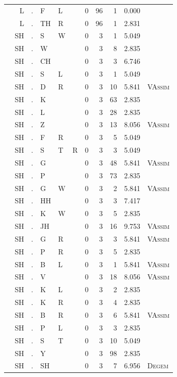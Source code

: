 \documentclass[12pt]{article}
\begin{document}
\begin{longtable}{r@{ } r@{ } c@{ } l@{ } l@{ } l@{ } r r r r l }
 & L & . & F & L &  & 0 & 96 & 1 & 0.000 &  \\
 & L & . & TH & R &  & 0 & 96 & 1 & 2.831 &  \\
 & SH & . & S & W &  & 0 & 3 & 1 & 5.049 &  \\
 & SH & . & W &  &  & 0 & 3 & 8 & 2.835 &  \\
 & SH & . & CH &  &  & 0 & 3 & 3 & 6.746 &  \\
 & SH & . & S & L &  & 0 & 3 & 1 & 5.049 &  \\
 & SH & . & D & R &  & 0 & 3 & 10 & 5.841 & \textsc{VAssim} \\
 & SH & . & K &  &  & 0 & 3 & 63 & 2.835 &  \\
 & SH & . & L &  &  & 0 & 3 & 28 & 2.835 &  \\
 & SH & . & Z &  &  & 0 & 3 & 13 & 8.056 & \textsc{VAssim} \\
 & SH & . & F & R &  & 0 & 3 & 5 & 5.049 &  \\
 & SH & . & S & T & R & 0 & 3 & 3 & 5.049 &  \\
 & SH & . & G &  &  & 0 & 3 & 48 & 5.841 & \textsc{VAssim} \\
 & SH & . & P &  &  & 0 & 3 & 73 & 2.835 &  \\
 & SH & . & G & W &  & 0 & 3 & 2 & 5.841 & \textsc{VAssim} \\
 & SH & . & HH &  &  & 0 & 3 & 3 & 7.417 &  \\
 & SH & . & K & W &  & 0 & 3 & 5 & 2.835 &  \\
 & SH & . & JH &  &  & 0 & 3 & 16 & 9.753 & \textsc{VAssim} \\
 & SH & . & G & R &  & 0 & 3 & 3 & 5.841 & \textsc{VAssim} \\
 & SH & . & P & R &  & 0 & 3 & 5 & 2.835 &  \\
 & SH & . & B & L &  & 0 & 3 & 1 & 5.841 & \textsc{VAssim} \\
 & SH & . & V &  &  & 0 & 3 & 18 & 8.056 & \textsc{VAssim} \\
 & SH & . & K & L &  & 0 & 3 & 2 & 2.835 &  \\
 & SH & . & K & R &  & 0 & 3 & 4 & 2.835 &  \\
 & SH & . & B & R &  & 0 & 3 & 6 & 5.841 & \textsc{VAssim} \\
 & SH & . & P & L &  & 0 & 3 & 3 & 2.835 &  \\
 & SH & . & S & T &  & 0 & 3 & 10 & 5.049 &  \\
 & SH & . & Y &  &  & 0 & 3 & 98 & 2.835 &  \\
 & SH & . & SH &  &  & 0 & 3 & 7 & 6.956 & \textsc{Degem} \\

\end{longtable}
\end{document}
